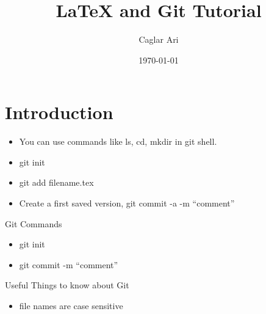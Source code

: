 \documentclass[12pt]{article}
\begin{document}
\title{\LaTeX\; and Git Tutorial}
\author{Caglar Ari}
\date{\today}
\maketitle
{}

\section{Introduction}
\begin{itemize}
\item You can use commands like ls, cd, mkdir in git shell.
\item git init
\item git add filename.tex
\item Create a first saved version, git commit -a -m "`comment"'
\end{itemize}

Git Commands
\begin{itemize}
\item git init
\item git commit -m "`comment"'
\end{itemize}

Useful Things to know about Git
\begin{itemize}
\item file names are case sensitive
\end{itemize}
\end{document}
